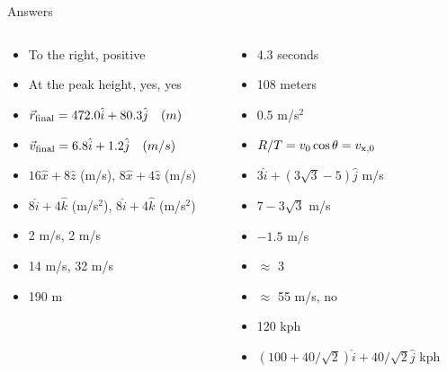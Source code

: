 \documentclass{beamer}
\begin{document}
\begin{frame}{Answers}
\begin{columns}[T]
\begin{column}{0.5\textwidth}
\begin{itemize}
\item To the right, positive
\item At the peak height, yes, yes
\item $\vec{r}_{\rm final} = 472.0 \hat{i} + 80.3\hat{j}\quad (m)$
\item $\vec{v}_{\rm final} = 6.8 \hat{i} + 1.2\hat{j}\quad (m/s)$
\item $16 \hat{x} + 8\hat{z}$ (m/s), $8\hat{x} + 4\hat{z}$ (m/s)
\item $8\hat{i} + 4\hat{k}$ (m/s$^2$), $8\hat{i} + 4\hat{k}$ (m/s$^2$)
\item 2 m/s, 2 m/s
\item 14 m/s, 32 m/s
\item 190 m
\end{itemize}
\end{column}
\begin{column}{0.5\textwidth}
\begin{itemize}
\item 4.3 seconds
\item 108 meters
\item 0.5 m/s$^2$
\item $R/T = v_{\rm 0} \cos\theta = v_{\rm x,0}$
\item $3\hat{i} + (3\sqrt{3}-5)\hat{j}$  m/s
\item $7-3\sqrt{3}$ m/s
\item $-1.5$ m/s
\item $\approx$ 3
\item $\approx$ 55 m/s, no
\item 120 kph
\item $(100+40/\sqrt{2})\hat{i} + 40/\sqrt{2}\hat{j}$  kph
\end{itemize}
\end{column}
\end{columns}
\end{frame}
\end{document}
